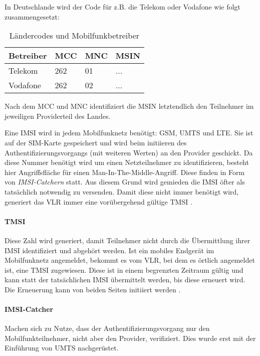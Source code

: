 In Deutschlande wird der Code für z.B. die Telekom oder Vodafone wie folgt zusammengesetzt:

  \begin{table}[h]
    \begin{tabularx}{\textwidth}{|l||l|l|X|}
    \hline
      \textbf{Betreiber} & \textbf{MCC} & \textbf{MNC} & \textbf{MSIN} \\
    \hline
    \hline
      Telekom & 262 & 01 & ... \\
    \hline
    \hline
      Vodafone & 262 & 02 & ...\\
    \hline
    \end{tabularx}
    \caption{Ländercodes und Mobilfunkbetreiber}
  \end{table}

Nach dem \ac{MCC} und \ac{MNC} identifiziert die \ac{MSIN} letztendlich
den Teilnehmer im jeweiligen Providerteil des Landes.

Eine \ac{IMSI} wird in jedem Mobilfunknetz benötigt: \ac{GSM}, \ac{UMTS}
und \ac{LTE}. Sie ist auf der SIM-Karte gespeichert und wird beim
initiieren des Authentifizierungsvorgangs (mit weiteren Werten) an
den Provider geschickt. Da diese Nummer benötigt wird um einen Netzteilnehmer
zu identifizieren, besteht hier Angriffsfläche für einen Man-In-The-Middle-Angriff. Diese finden in Form von \textit{IMSI-Catchern} statt.
Aus diesem Grund wird gemieden die IMSI öfter als tatsächlich notwendig
zu versenden. Damit diese nicht immer benötigt wird, generiert das
\ac{VLR} immer eine vorübergehend gültige \ac{TMSI} \cite{3gpp.33.003}.

\paragraph{TMSI} Diese Zahl wird generiert, damit Teilnehmer nicht
durch die Übermittlung ihrer \ac{IMSI} identifiziert und abgehört werden.
Ist ein mobiles Endgerät im Mobilfunknetz angemeldet, bekommt es vom
\ac{VLR}, bei dem es örtlich angemeldet ist, eine \ac{TMSI} zugewiesen.
Diese ist in einem begrenzten Zeitraum gültig und kann statt der
tatsächlichen \ac{IMSI} übermittelt werden, bis diese erneuert wird.
Die Erneuerung kann von beiden Seiten initiiert werden \cite{3gpp.33.003}.

\label{par:imsicatcher}
\paragraph{IMSI-Catcher} Machen sich zu Nutze, dass der
Authentifizierungsvorgang nur den Mobilfunkteilnehmer, nicht aber den 
Provider, verifiziert. Dies wurde erst mit der Einfüh\-rung von \ac{UMTS}
nachgerüstet.

